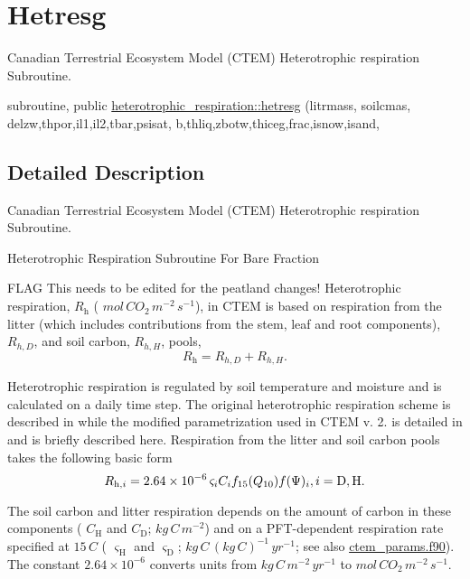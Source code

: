 \hypertarget{group__hetresg}{}\section{Hetresg}
\label{group__hetresg}


Canadian Terrestrial Ecosystem Model (C\+T\+E\+M) Heterotrophic respiration Subroutine.  


\begin{DoxyCompactItemize}
\item 
subroutine, public \hyperlink{group__hetresg_gaf35383e36392dff7ca33ff9022cb70c0}{heterotrophic\+\_\+respiration\+::hetresg} (litrmass, soilcmas, delzw,thpor,il1,il2,tbar,psisat, b,thliq,zbotw,thiceg,frac,isnow,isand,
\end{DoxyCompactItemize}


\subsection{Detailed Description}
Canadian Terrestrial Ecosystem Model (C\+T\+E\+M) Heterotrophic respiration Subroutine. 

Heterotrophic Respiration Subroutine For Bare Fraction

F\+L\+A\+G This needs to be edited for the peatland changes! Heterotrophic respiration, $R_\mathrm{h}$ ( $mol\,CO_2\,m^{-2}\,s^{-1}$), in C\+T\+E\+M is based on respiration from the litter (which includes contributions from the stem, leaf and root components), $R_{h,D}$, and soil carbon, $R_{h,H}$, pools, \[ \label{hetres_all} R_\mathrm{h}=R_{h,D}+R_{h,H}. \]

Heterotrophic respiration is regulated by soil temperature and moisture and is calculated on a daily time step. The original heterotrophic respiration scheme is described in \cite{Arora2003-3b7} while the modified parametrization used in C\+T\+E\+M v. 2. is detailed in \cite{Melton2014-xy} and is briefly described here. Respiration from the litter and soil carbon pools takes the following basic form \[ R_{\mathrm{h},i} = 2.64 \times 10^{-6}\,\varsigma_i C_i f_{15}(Q_{10}) f(\Psi)_i, \nonumber \\ i = \mathrm{D}, \mathrm{H}.\label{lithet} \]

The soil carbon and litter respiration depends on the amount of carbon in these components ( $C_\mathrm{H}$ and $C_\mathrm{D}$; $kg\,C\,m^{-2}$) and on a P\+F\+T-\/dependent respiration rate specified at $15\,{C}$ ( $\varsigma_\mathrm{H}$ and $\varsigma_\mathrm{D}$; $kg\,C\,(kg\,C)^{-1}\,yr^{-1}$; see also \hyperlink{ctem__params_8f90}{ctem\+\_\+params.\+f90}). The constant $2.64 \times 10^{-6}$ converts units from $kg\,C\,m^{-2}\,yr^{-1}$ to $mol\,CO_2\,m^{-2}\,s^{-1}$.

